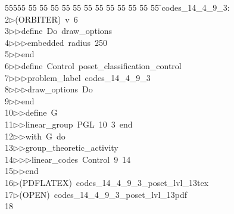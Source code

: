 %
%
\begin{tabbing}
55555 \= 55 \= 55 \= 55 \= 55 \= 55 \= 55 \= 55 \= 55 \= 55 \= 55 \= 55 \= 55 \= \>codes\_14\_4\_9\_3:\\[0pt]
2\>$\triangleright$\>(ORBITER)\ v\ 6\ \\[0pt]
3\>$\triangleright$\>$\triangleright$\>define\ Do\ draw\_options\ \\[0pt]
4\>$\triangleright$\>$\triangleright$\>$\triangleright$\>embedded\ radius\ 250\ \\[0pt]
5\>$\triangleright$\>$\triangleright$\>end\ \\[0pt]
6\>$\triangleright$\>$\triangleright$\>define\ Control\ poset\_classification\_control\ \\[0pt]
7\>$\triangleright$\>$\triangleright$\>$\triangleright$\>problem\_label\ codes\_14\_4\_9\_3\ \\[0pt]
8\>$\triangleright$\>$\triangleright$\>$\triangleright$\>draw\_options\ Do\ \\[0pt]
9\>$\triangleright$\>$\triangleright$\>end\ \\[0pt]
10\>$\triangleright$\>$\triangleright$\>define\ G\ \\[0pt]
11\>$\triangleright$\>$\triangleright$\>linear\_group\ PGL\ 10\ 3\ end\ \\[0pt]
12\>$\triangleright$\>$\triangleright$\>with\ G\ do\ \\[0pt]
13\>$\triangleright$\>$\triangleright$\>group\_theoretic\_activity\ \\[0pt]
14\>$\triangleright$\>$\triangleright$\>$\triangleright$\>linear\_codes\ Control\ 9\ 14\ \\[0pt]
15\>$\triangleright$\>$\triangleright$\>end\\[0pt]
16\>$\triangleright$\>(PDFLATEX)\ codes\_14\_4\_9\_3\_poset\_lvl\_13tex\\[0pt]
17\>$\triangleright$\>(OPEN)\ codes\_14\_4\_9\_3\_poset\_lvl\_13pdf\ \\[0pt]
18\>\end{tabbing}
